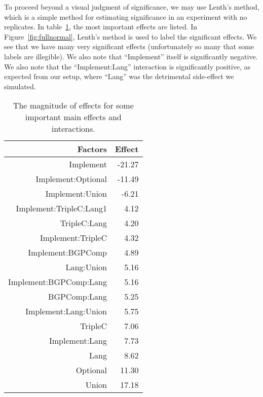 \documentclass{llncs}
\begin{document}
To proceed beyond a visual judgment of significance, we may use
Lenth's method\cite{lenthmethod}, which is a simple method for
estimating significance in an experiment with no replicates. In
table~\ref{tab:effects}, the most important effects are listed.  In
Figure~\ref{fig:fullnormal}, Lenth's method is used to label the
significant effects. We see that we have many very significant effects
(unfortunately so many that some labels are illegible). We also note that
``Implement'' itself is significantly negative. We also note that the
``Implement:Lang'' interaction is significantly positive, as expected
from our setup, where ``Lang'' was the detrimental side-effect we
simulated.

\begin{table}[hb]
\begin{center}
\caption{The magnitude of effects for some important main effects and interactions.}\label{tab:effects}
\begin{tabular}{rr}
  \hline
Factors & Effect  \\ 
  \hline
Implement & -21.27 \\ 
  Implement:Optional & -11.49 \\ 
  Implement:Union & -6.21 \\ 
  Implement:TripleC:Lang1 & 4.12 \\ 
  TripleC:Lang & 4.20 \\ 
  Implement:TripleC & 4.32 \\ 
  Implement:BGPComp & 4.89 \\ 
  Lang:Union & 5.16 \\ 
  Implement:BGPComp:Lang & 5.16 \\ 
  BGPComp:Lang & 5.25 \\ 
  Implement:Lang:Union & 5.75 \\ 
  TripleC & 7.06 \\ 
  Implement:Lang & 7.73 \\ 
  Lang & 8.62 \\ 
  Optional & 11.30 \\ 
  Union & 17.18 \\ 
   \hline
\end{tabular}
\end{center}
\end{table}
\end{document}

